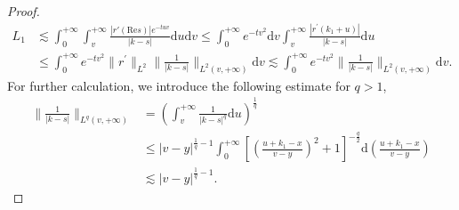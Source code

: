 \documentclass[10pt,a4paper]{amsart}
\begin{document}
\begin{proof}
\begin{align*}
L_1&\lesssim\int_0^{+\infty}\int_v^{+\infty}\frac{|r'(\mathrm{Re}s)| e^{- t uv}}{|k-s|}\mathrm{d}u\mathrm{d}v\leqslant\int_0^{+\infty}e^{- t v^2}\mathrm{d}v\int_v^{+\infty}\frac{|r^\prime(k_1+u)| }{|k-s|}\mathrm{d}u\\
    &\leqslant \int_0^{+\infty}e^{- t v^2}\|r^\prime\|_{L^2}\|\frac{1}{|k-s|}\|_{L^2(v,+\infty)}\mathrm{d}v\lesssim  \int_0^{+\infty}e^{- t v^2}\|\frac{1}{|k-s|}\|_{L^2(v,+\infty)}\mathrm{d}v.
\end{align*}
For further calculation, we introduce the following estimate for $q>1$,
\begin{equation}\label{eq41}
    \begin{aligned}
    \|\frac{1}{|k-s|}\|_{L^q(v,+\infty)}&=\left(\int_v^{+\infty}\frac{1}{|k-s|^q}\mathrm{d}u\right)^{\frac{1}{q}}\\
    &\leqslant|v-y|^{\frac{1}{q}-1}\int_0^{+\infty}\left[\left(\frac{u+k_1-x}{v-y}\right)^2+1\right]^{-\frac{q}{2}}\mathrm{d}\left(\frac{u+k_1-x}{v-y}\right)\\
    &\lesssim|v-y|^{\frac{1}{q}-1}.
\end{aligned}
\end{equation}



\end{proof}
\end{document}
